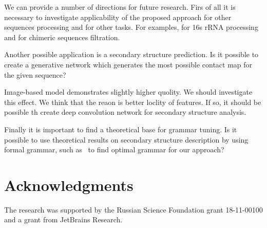 \documentclass[12pt,a4paper]{cibb}
\begin{document}
We can provide a number of directions for future research.
Firs of all it is necessary to investigate applicability of the proposed approach for other sequences processing and for other tasks.
For examples, for 16s rRNA processing and for chimeric sequences filtration.

Another possible application is a secondary structure prediction.
Is it possible to create a generative network which generates the most possible contact map for the given sequence?

Image-based model demonstrates slightly higher quolity.
We should investigate this effect.
We think that the reaon is better loclity of features.
If so, it should be possible th create deep convolution network for secondary structure analysis.

Finally it is important to find a theoretical base for grammar tuning. Is it possible to use theoretical results on secondary structure description by using formal grammar, such as~\cite{MQ!!!} to find optimal grammar for our approach?

\section*{\bf Acknowledgments}

The research was supported by the Russian Science Foundation grant 18-11-00100 and a grant from JetBrains Research.



%


{\fontsize{10}{10}\selectfont
\setlength{\parskip}{0pt}



}
\end{document}

